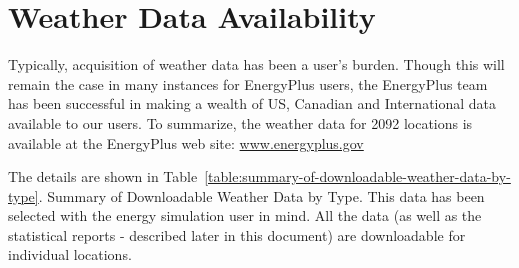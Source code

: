 \section{Weather Data Availability}\label{weather-data-availability}

Typically, acquisition of weather data has been a user's burden. Though this will remain the case in many instances for EnergyPlus users, the EnergyPlus team has been successful in making a wealth of US, Canadian and International data available to our users. To summarize, the weather data for 2092 locations is available at the EnergyPlus web site: \href{http://www.energyplus.gov}{www.energyplus.gov}

The details are shown in Table~\ref{table:summary-of-downloadable-weather-data-by-type}. Summary of Downloadable Weather Data by Type. This data has been selected with the energy simulation user in mind. All the data (as well as the statistical reports - described later in this document) are downloadable for individual locations.

